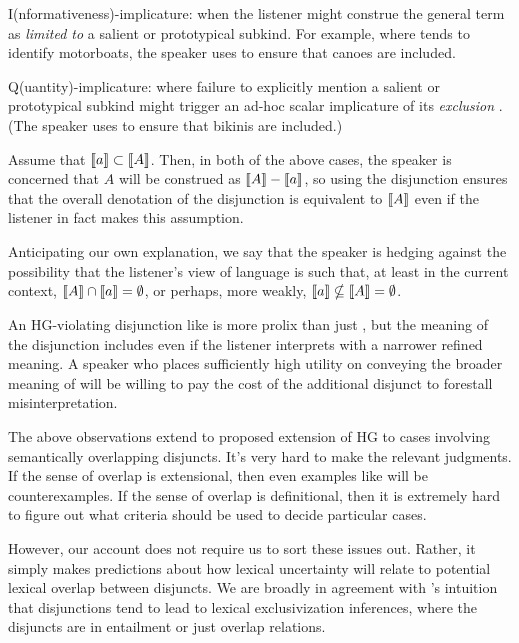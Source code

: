 \documentclass{article}
\begin{document}
\begin{examples}
  \begin{examples}
  \item I(nformativeness)-implicature: when the listener might
    construe the general term as \emph{limited to} a salient or
    prototypical subkind. For example, where  tends to
    identify motorboats, the speaker uses  to
    ensure that canoes are included.
    
  \item Q(uantity)-implicature: where failure to explicitly mention a
    salient or prototypical subkind might trigger an ad-hoc scalar
    implicature of its \emph{exclusion} \citep{hirschberg:1985}. (The
    speaker uses  to ensure that bikinis are
    included.)
  \end{examples}

\item Assume that $\llbracket a\rrbracket \subset \llbracket A\rrbracket$. Then, in both of the
  above cases, the speaker is concerned that $A$ will be construed as
  $\llbracket A\rrbracket-\llbracket a\rrbracket$, so using the disjunction ensures that the overall
  denotation of the disjunction is equivalent to $\llbracket A\rrbracket$ even if the
  listener in fact makes this assumption.

\item Anticipating our own explanation, we say that the speaker is
  hedging against the possibility that the listener's view of language
  is such that, at least in the current context, $\llbracket A\rrbracket \cap \llbracket a\rrbracket
  = \emptyset$, or perhaps, more weakly, $ \llbracket a\rrbracket \nsubseteq \llbracket A\rrbracket
  = \emptyset$.

\item An HG-violating disjunction like  is more
  prolix than just , but the meaning of the disjunction
  includes  even if the listener interprets 
  with a narrower refined meaning.  A speaker who places sufficiently
  high utility on conveying the broader meaning of  will be
  willing to pay the cost of the additional disjunct to forestall
  misinterpretation.

\item The above observations extend to  proposed
  extension of HG to cases involving semantically overlapping
  disjuncts. It's very hard to make the relevant judgments.  If the
  sense of overlap is extensional, then even examples like
   will be counterexamples. If the sense of
  overlap is definitional, then it is extremely hard to figure out
  what criteria should be used to decide particular cases. 

\item However, our account does not require us to sort these issues
  out. Rather, it simply makes predictions about how lexical
  uncertainty will relate to potential lexical overlap between
  disjuncts. We are broadly in agreement with
  \citeauthor{Singh:2008}'s intuition that disjunctions tend to lead
  to lexical exclusivization inferences, where the disjuncts are in
  entailment or just overlap relations.
\end{examples}
 
\end{document}
